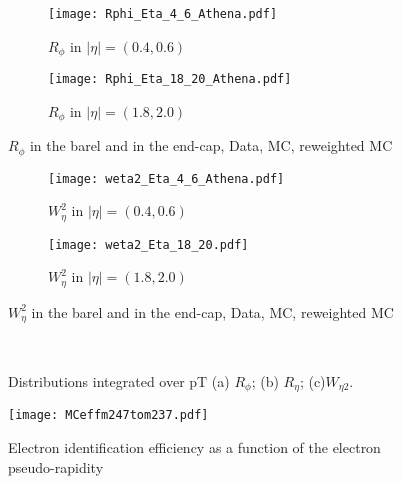       \begin{figure}[htbp]
  	\begin{subfigure}[t]{0.5\textwidth}
  		\texttt{[image: Rphi\_Eta\_4\_6\_Athena.pdf]}
  		\caption{$R_{\phi}$ in $|\eta| = (0.4,0.6)$ }
  		\label{fig::rphi_rew_04}
  	\end{subfigure}
  	\hfill
  	\begin{subfigure}[t]{0.5\textwidth} 
  		\texttt{[image: Rphi\_Eta\_18\_20\_Athena.pdf]}
  		\caption{$R_{\phi}$ in $|\eta| = (1.8,2.0)$ }
  		\label{fig::rphi_rew_18}
  	\end{subfigure}
  	\caption{$R_{\phi}$ in the barel and in the end-cap, Data, MC, reweighted MC}
  	\label{fig::rphi_rew}
  \end{figure}
  
    \begin{figure}[htbp]
	\begin{subfigure}[t]{0.5\textwidth}
		\texttt{[image: weta2\_Eta\_4\_6\_Athena.pdf]}
		\caption{$W_{\eta}^2$ in $|\eta| = (0.4,0.6)$ }
		\label{fig::weta2_rew_04}
	\end{subfigure}
	\hfill
	\begin{subfigure}[t]{0.5\textwidth} 
		\texttt{[image: weta2\_Eta\_18\_20.pdf]}
		\caption{$W_{\eta}^2$ in $|\eta| = (1.8,2.0)$ }
		\label{fig::weta2_rew_18}
	\end{subfigure}
	\caption{$W_{\eta}^2$ in the barel and in the end-cap, Data, MC, reweighted MC}
	\label{fig::weta2_rew}
\end{figure}

\begin{figure*}[ht!]
	\quad
	\quad
	\\

	\caption{ 	\label{fig::integrated} Distributions integrated over pT (a) $R_{\phi}$; (b) $R_{\eta}$; (c)$W_{\eta 2}$.}
\end{figure*}


  
  \begin{figure}[htbp]
  	\centering
  	\texttt{[image: MCeffm247tom237.pdf]}\\
  	\caption{Electron identification efficiency as a function of the electron pseudo-rapidity}
  	\label{fig::SF}
  \end{figure}
